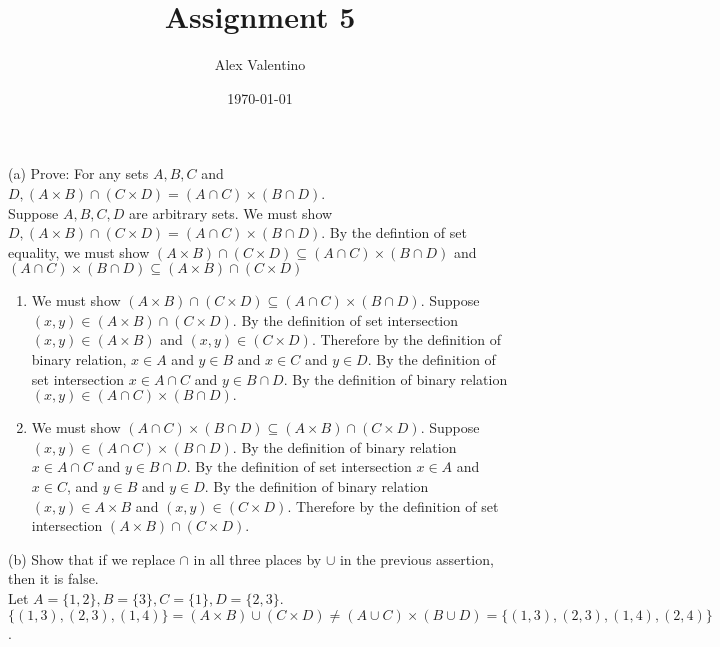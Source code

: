 \documentclass[12pt, letterpaper]{article}
\date{\today}
\author{Alex Valentino}
\title{Assignment 5}
\begin{document}
	(a) Prove: For any sets $A, B, C$ and $D,(A \times B) \cap(C \times D)=(A \cap C) \times(B \cap D)$.\\
	Suppose $A, B, C,D$ are arbitrary sets.  We must show $D,(A \times B) \cap(C \times D)=(A \cap C) \times(B \cap D)$.  By the defintion of set equality, we must show $(A \times B) \cap(C \times D) \subseteq (A \cap C) \times(B \cap D)$ and $(A \cap C) \times(B \cap D) \subseteq (A \times B) \cap(C \times D)$
	\begin{enumerate}
		\item We must show $(A \times B) \cap(C \times D) \subseteq (A \cap C) \times(B \cap D)$.   Suppose $(x,y) \in (A \times B) \cap(C \times D).$  By the definition of set intersection $(x,y) \in (A \times B)$ and $(x,y) \in (C \times D).$  Therefore by the definition of binary relation, $x \in A$ and $y \in B$ and $x \in C$ and $y \in D$.  By the definition of set intersection $x \in A \cap C$ and $y \in B \cap D.$  By the definition of binary relation $(x,y) \in (A \cap C) \times(B \cap D).$
		\item We must show  $(A \cap C) \times(B \cap D) \subseteq (A \times B) \cap(C \times D)$.  Suppose $(x,y) \in (A \cap C) \times(B \cap D).$  By the definition of binary relation $x \in A \cap C$ and $y \in B \cap D.$  By the definition of set intersection $x \in A$ and $x \in C$, and $y \in B$ and $y \in D$.  By the definition of binary relation $(x,y) \in A \times B$ and $(x,y) \in (C \times D).$  Therefore by the definition of set intersection $(A \times B) \cap(C \times D)$.
	\end{enumerate}
(b) Show that if we replace $\cap$ in all three places by $\cup$ in the previous assertion, then it is false.\\
Let $A = \{1,2\}, B= \{3\}, C = \{1\}, D = \{2,3\}$. $ \{(1,3),(2,3),(1,4)\} = (A \times B) \cup(C \times D) \neq (A \cup C) \times(B \cup D)= \{(1,3),(2,3),(1,4),(2,4)\}$.
\end{document}
